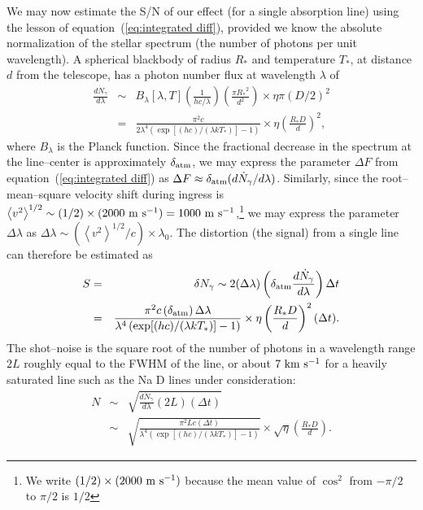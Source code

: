 \documentclass[12pt,preprint]{aastex}
\begin{document}
We may now estimate the S/N of our effect (for a single absorption line) using
the lesson of equation~(\ref{eq:integrated diff}), provided we know the
absolute normalization of the stellar spectrum (the number of photons per unit
wavelength).  A spherical blackbody of radius $R_*$ and temperature $T_*$,
at distance $d$ from the telescope, has a photon  number flux at wavelength
$\lambda$ of
\begin{eqnarray}
\nonumber \frac{d \dot{N}_\gamma}{d \lambda} & \sim & B_\lambda[\lambda,T] \left( \frac{1}{h c/\lambda} \right) \left( \frac{\pi {R_*}^2}{d^2} \right) \times \eta \pi (D/2)^2\\
\label{eq:spectrum} & = & \frac{\pi^2 c}{2 \lambda^4 \left( \exp[(h c)/(\lambda k T_*)] -1 \right)} \times \eta \left(\frac{{R_* D}}{d}\right)^2,
\end{eqnarray}
where $B_\lambda$ is the Planck function.
Since the fractional decrease in the spectrum at the line--center is
approximately $\delta_{\rm atm}$, we may express the parameter $\Delta F$
from equation~(\ref{eq:integrated diff}) as
$\Delta F \approx \delta_{\rm atm} (d \dot{N}_\gamma / d \lambda)$.
Similarly, since the root--mean--square velocity shift during ingress is
$\left< v^2 \right>^{1/2} \sim (1/2) \times( 2000 {\rm~m~s^{-1}}) = 1000 {\rm ~m~s^{-1}}$,\footnote{We write $(1/2) \times (2000 {\rm~m~s^{-1}})$ because the
mean value of $\cos^2$ from $-\pi/2$ to $\pi/2$ is $1/2$}
we may express the parameter $\Delta \lambda$ as
$\Delta \lambda \sim (\left< v^2 \right>^{1/2} / c) \times \lambda_0$.
The distortion (the signal) from a single line can therefore be estimated as
\begin{eqnarray}
\nonumber S & = & \delta N_\gamma \sim 2 (\Delta \lambda) \left( \delta_{\rm atm} \frac{d \dot{N}_\gamma}{d \lambda}\right) \Delta t\\
\label{eq:signal estimate} & = & \frac{\pi^2 c \left(\delta_{\rm atm}\right) \Delta \lambda}{\lambda^4 \left( \exp[(h c)/(\lambda k T_*)] -1 \right)} \times \eta \left(\frac{{R_* D}}{d}\right)^2 (\Delta t).
\end{eqnarray}
The shot--noise is the square root of the number of photons in a wavelength
range $2L$ roughly equal to the FWHM of the line, or about $7 {\rm ~km~s^{-1}}$
for a heavily saturated line such as the Na D lines under consideration:
\begin{eqnarray}
\nonumber N & \sim & \sqrt{\frac{d \dot{N}_\gamma}{d\lambda} (2L) (\Delta t)} \\
\label{eq:noise estimate} & \sim & \sqrt{\frac{\pi^2 L c (\Delta t)}{\lambda^4 \left( \exp[(h c)/(\lambda k T_*)] -1 \right)}} \times \sqrt{\eta} \left( \frac{R_* D}{d} \right).
\end{eqnarray}
\end{document}
